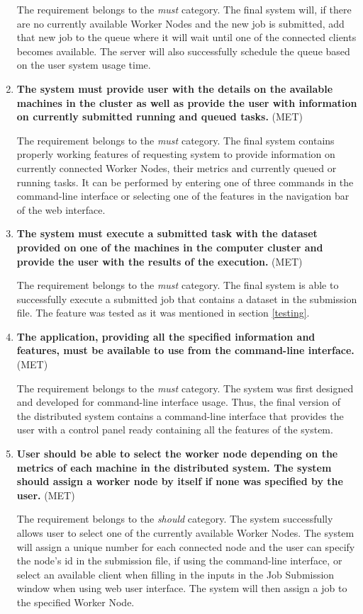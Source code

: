 \documentclass[10pt]{report}
\begin{document}
\begin{enumerate}
    The requirement belongs to the \textit{must} category. The final system will, if there are no currently available Worker Nodes and the new job is submitted, add that new job to the queue where it will wait until one of the connected clients becomes available. The server will also successfully schedule the queue based on the user system usage time.

    \item \textbf{The system must provide user with the details on the available machines in the cluster as well as provide the user with information on currently submitted running and queued tasks.} (MET)

    The requirement belongs to the \textit{must} category. The final system contains properly working features of requesting system to provide information on currently connected Worker Nodes, their metrics and currently queued or running tasks. It can be performed by entering one of three commands in the command-line interface or selecting one of the features in the navigation bar of the web interface.

    \item \textbf{The system must execute a submitted task with the dataset provided on one of the machines in the computer cluster and provide the user with the results of the execution.} (MET)

    The requirement belongs to the \textit{must} category. The final system is able to successfully execute a submitted job that contains a dataset in the submission file. The feature was tested as it was mentioned in section \ref{testing}.

    \item \textbf{The application, providing all the specified information and features, must be available to use from the command-line interface.} (MET)

    The requirement belongs to the \textit{must} category. The system was first designed and developed for command-line interface usage. Thus, the final version of the distributed system contains a command-line interface that provides the user with a control panel ready containing all the features of the system.

    \item \textbf{User should be able to select the worker node depending on the metrics of each machine in the distributed system. The system should assign a worker node by itself if none was specified by the user.} (MET)

    The requirement belongs to the \textit{should} category. The system successfully allows user to select one of the currently available Worker Nodes. The system will assign a unique number for each connected node and the user can specify the node's id in the submission file, if using the command-line interface, or select an available client when filling in the inputs in the Job Submission window when using web user interface. The system will then assign a job to the specified Worker Node.


\end{enumerate}
\end{document}
